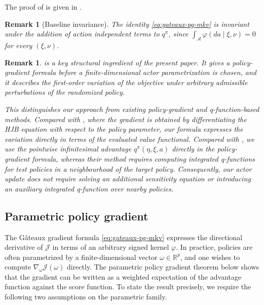 \documentclass[a4paper, 10pt, english, reqno]{amsart}
\newtheorem{remark}[theorem]{Remark}
\begin{document}
 The proof of  is given in .
\begin{remark}[Baseline invariance]
\label{rem:baseline-invariance-gateaux}
The identity \eqref{eq:gateaux-pg-mkv} is invariant under the addition of action independent terms to $q^\pi$,
since $\int_{\mathcal A}\varphi(d a\mid \xi,\nu)=0$ for every $(\xi,\nu)$.
\end{remark}
\begin{remark}
\label{rem:policy-gradient-comparison}
 is a key structural ingredient of the
present paper. It gives a policy-gradient formula before a
finite-dimensional actor parametrization is chosen, and it describes the
first-order variation of the objective under arbitrary admissible
perturbations of the randomized policy.

This distinguishes our approach from existing policy-gradient and
q-function-based methods. Compared with \cite{frikhaActorCritic}, where
the gradient is obtained by differentiating the HJB equation with
respect to the policy parameter, our formula expresses the variation
directly in terms of the evaluated value functional. Compared with
\cite{Wei2023ContinuousTQ}, we use the pointwise infinitesimal advantage
$q^\pi(\eta,\xi,a)$ directly in the policy-gradient formula, whereas
their method requires computing integrated q-functions for test policies
in a neighbourhood of the target policy. Consequently, our actor update
does not require solving an additional sensitivity equation or
introducing an auxiliary integrated q-function over nearby policies.
\end{remark}

\subsection{Parametric policy gradient}
\label{subsec:parametric-pg}

The G\^ateaux gradient formula \eqref{eq:gateaux-pg-mkv} expresses the
directional derivative of $\mathcal J$ in terms of an arbitrary signed
kernel $\varphi$. In practice, policies are often parametrized by a
finite-dimensional vector $\omega\in\mathbb R^p$, and one wishes to
compute $\nabla_\omega \mathcal J(\omega)$ directly. The parametric
policy gradient theorem below shows that the gradient can be written as
a weighted expectation of the advantage function against the score
function. To state the result precisely, we require the following two
assumptions on the parametric family.
\medbreak
\end{document}
